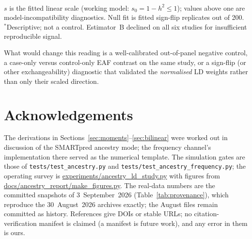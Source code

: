 \documentclass[11pt,a4paper]{article}
\begin{document}
\begin{table}[htbp]
\centering
\small
\caption{Estimator~A LD-mixture weights on the same Yengo analyses.
All five controls ranked the declared reference first. Every fit
is on the simplex boundary. Snapshot
\texttt{yengo-height-2026-09-03} (Table~\ref{tab:provenance}).}
\label{tab:yengo-ld}
\\[0.4em]
{\footnotesize $s$ is the fitted linear scale (working model:
$s_0 = 1-h^2 \le 1$); values above one are model-incompatibility
diagnostics. Null fit is fitted sign-flip replicates out of 200.
$^*$Descriptive; not a control. Estimator~B declined
on all six studies for insufficient reproducible signal.}
\end{table}

What would change this reading is a well-calibrated out-of-panel
negative control, a case-only versus control-only EAF contrast on
the same study, or a sign-flip (or other exchangeability) diagnostic
that validated the \emph{normalised} LD weights rather than only
their scaled direction.

\section*{Acknowledgements}

The derivations in Sections~\ref{sec:moments}--\ref{sec:bilinear} were
worked out in discussion of the SMARTpred ancestry mode; the frequency
channel's implementation there served as the numerical template. The
simulation gates are those of \texttt{tests/test\_ancestry.py} and
\texttt{tests/test\_ancestry\_frequency.py}; the operating survey is
\url{experiments/ancestry_ld_study.py} with figures from
\url{docs/ancestry_report/make_figures.py}. The real-data numbers are
the committed snapshots of 3~September~2026 (Table~\ref{tab:provenance}),
which reproduce the 30~August~2026 archives exactly; the August files
remain committed as history. References give DOIs or stable URLs; no
citation-verification manifest is claimed (a manifest is future work),
and any error in them is ours.
\end{document}
